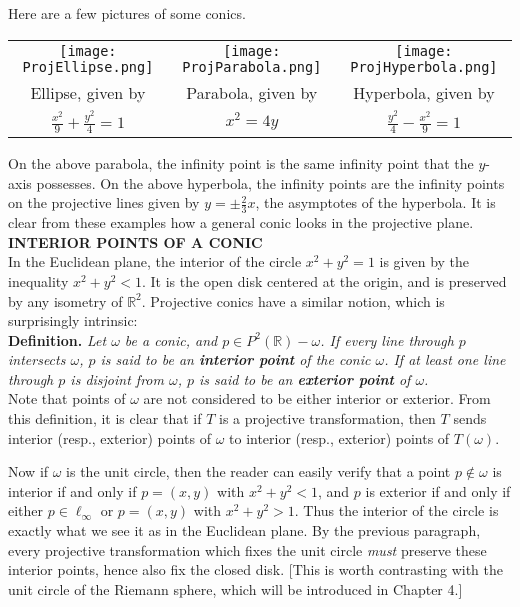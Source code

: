 \documentclass[leqno]{book}
\begin{document}
Here are a few pictures of some conics.
\begin{center}
\begin{tabular}{ccc}
\texttt{[image: ProjEllipse.png]} &
\texttt{[image: ProjParabola.png]} &
\texttt{[image: ProjHyperbola.png]} \\
Ellipse, given by &
Parabola, given by &
Hyperbola, given by \\
$\frac{x^2}9+\frac{y^2}4=1$ & $x^2=4y$ & $\frac{y^2}4-\frac{x^2}9=1$
\end{tabular}
\end{center}
On the above parabola, the infinity point is the same infinity point that the $y$-axis possesses.  On the above hyperbola, the infinity points are the infinity points on the projective lines given by $y=\pm\frac 23x$, the asymptotes of the hyperbola.  It is clear from these examples how a general conic looks in the projective plane.\\

\noindent\textbf{INTERIOR POINTS OF A CONIC}\\

\noindent In the Euclidean plane, the interior of the circle $x^2+y^2=1$ is given by the inequality $x^2+y^2<1$.  It is the open disk centered at the origin, and is preserved by any isometry of $\mathbb R^2$.  Projective conics have a similar notion, which is surprisingly intrinsic:\\

\noindent\textbf{Definition.} \emph{Let $\omega$ be a conic, and $p\in P^2(\mathbb R)-\omega$.  If every line through $p$ intersects $\omega$, $p$ is said to be an \textbf{interior point} of the conic $\omega$.  If at least one line through $p$ is disjoint from $\omega$, $p$ is said to be an \textbf{exterior point} of $\omega$.}\\

\noindent Note that points of $\omega$ are not considered to be either interior or exterior.  From this definition, it is clear that if $T$ is a projective transformation, then $T$ sends interior (resp., exterior) points of $\omega$ to interior (resp., exterior) points of $T(\omega)$.

Now if $\omega$ is the unit circle, then the reader can easily verify that a point $p\notin\omega$ is interior if and only if $p=(x,y)$ with $x^2+y^2<1$, and $p$ is exterior if and only if either $p\in\ell_\infty$ or $p=(x,y)$ with $x^2+y^2>1$.  Thus the interior of the circle is exactly what we see it as in the Euclidean plane.  By the previous paragraph, every projective transformation which fixes the unit circle \emph{must} preserve these interior points, hence also fix the closed disk.  [This is worth contrasting with the unit circle of the Riemann sphere, which will be introduced in Chapter 4.]
\end{document}
